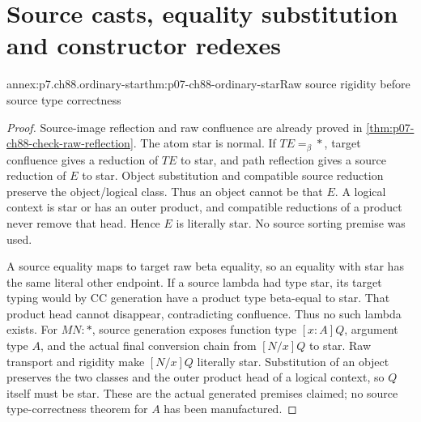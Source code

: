 \section{Source casts, equality substitution and constructor redexes}
\label{sec:annex-p07-ch88-ordinary-checking}

\begin{annexitem}{annex:p7.ch88.ordinary-star}{thm:p07-ch88-ordinary-star}{Raw source rigidity before source type correctness}
\begin{proof}
Source-image reflection and raw confluence are already proved in
\cref{thm:p07-ch88-check-raw-reflection}. The atom star is normal.
If \(TE=_\beta\ast\), target confluence gives a reduction of
\(TE\) to star, and path reflection gives a source reduction of
\(E\) to star. Object substitution and compatible source reduction
preserve the object/logical class. Thus an object cannot be that
\(E\). A logical context is star or has an outer product, and
compatible reductions of a product never remove that head. Hence
\(E\) is literally star. No source sorting premise was used.

A source equality maps to target raw beta equality, so an equality
with star has the same literal other endpoint. If a source lambda
had type star, its target typing would by CC generation have a
product type beta-equal to star. That product head cannot disappear,
contradicting confluence. Thus no such lambda exists.
For \(MN:\ast\), source generation exposes function type
\([x:A]Q\), argument type \(A\), and the actual final conversion
chain from \([N/x]Q\) to star. Raw transport and rigidity make
\([N/x]Q\) literally star. Substitution of an object preserves
the two classes and the outer product head of a logical context,
so \(Q\) itself must be star. These are the actual generated
premises claimed; no source type-correctness theorem for \(A\)
has been manufactured.
\end{proof}
\end{annexitem}

